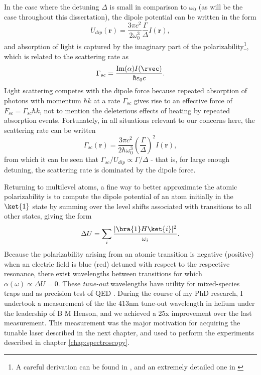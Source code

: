 	In the case where the detuning $\Delta$ is small in comparison to $\omega_0$ (as will be the case throughout this dissertation), the dipole potential can be written in the form \cite{grimm00}
	\begin{equation}
		U_{dip}(\textbf{r}) = \frac{3\pi c^2}{2\omega_0^3}\frac{\Gamma}{\Delta}I(\textbf{r}),
	\end{equation}
	and absorption of light is captured by the imaginary part of the polarizability\footnote{A careful derivation can be found in \cite{FootAtomic}, and an extremely detailed one in \cite{CohenTannoudji}}, which is related to the scattering rate as
	\begin{equation}
		\Gamma_{sc} = \frac{\textrm{Im}(\alpha)I(\rvec)}{\hbar\varepsilon_0 c}.
	\end{equation}
	Light scattering competes with the dipole force because repeated absorption of photons with momentum $\hbar k$ at a rate $\Gamma_{sc}$ gives rise to an effective force of $F_{sc}=\Gamma_{sc}\hbar k$, not to mention the deleterious effects of heating by repeated absorption events. Fortunately, in all situations relevant to our concerns here, the scattering rate can be written 
	\begin{equation}
		\Gamma_{sc}(\textbf{r}) = \frac{3\pi c^2}{2\hbar\omega_0^3}\left(\frac{\Gamma}{\Delta}\right)^2 I(\textbf{r}),
	\end{equation}
	from which it can be seen that $\Gamma_{sc}/U_{dip} \propto \Gamma/\Delta$ - that is, for large enough detuning, the scattering rate is dominated by the dipole force. 

	Returning to multilevel atoms, a fine way to better approximate the atomic polarizability is to compute the dipole potential of an atom initially in the $\ket{1}$ state by summing over the level shifts associated with transitions to all other states, giving the form
	\begin{equation}
		\Delta U = \sum_i \frac{|\bra{1}H\ket{i}|^2}{\omega_i}.
	\end{equation}
	Because the polarizability arising from an atomic transition is negative (positive) when an electric field is blue (red) detuned with respect to the respective resonance, there exist wavelengths between transitions for which $\alpha(\omega)\propto\Delta U = 0$. These \emph{tune-out} wavelengths have utility for mixed-species traps and as precision test of QED \cite{henson15,mitroy13,TOforthcoming}. During the course of my PhD research, I undertook a measurement of the the 413nm tune-out wavelength in helium under the leadership of B M Henson, and we achieved a 25x improvement over the last measurement. This measurement was the major motivation for acquiring the tunable laser described in the next chapter, and used to perform the experiments described in chapter \ref{chap:spectroscopy}.

